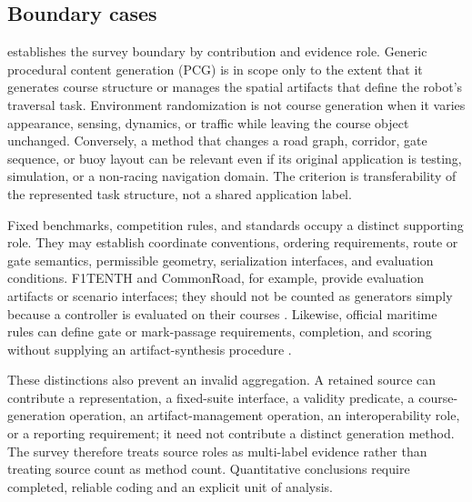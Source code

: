 \subsection{Boundary cases}

 establishes the survey boundary by contribution and
evidence role. Generic procedural content generation (PCG) is in scope only to the
extent that it generates course structure or manages the spatial artifacts that
define the robot's traversal task. Environment
randomization is not course generation when it varies appearance, sensing, dynamics,
or traffic while leaving the course object unchanged. Conversely, a method that
changes a road graph, corridor, gate sequence, or buoy layout can be relevant even if
its original application is testing, simulation, or a non-racing navigation domain.
The criterion is transferability of the represented task structure, not a shared
application label.

Fixed benchmarks, competition rules, and standards occupy a distinct supporting
role. They may establish coordinate conventions, ordering requirements, route or
gate semantics, permissible geometry, serialization interfaces, and evaluation
conditions. F1TENTH and CommonRoad, for example, provide evaluation artifacts or
scenario interfaces; they should not be counted as generators simply because a
controller is evaluated on their courses \cite{OKelly2020F1TENTHOpen,Althoff2017CommonRoadComposable}.
Likewise, official maritime rules can define gate or mark-passage requirements,
completion, and scoring without supplying an artifact-synthesis procedure
\cite{RoboNation20222022Maritime,WRSCIRSCOrganizingCommittee2019WorldRobotic}.

These distinctions also prevent an invalid aggregation. A retained source can
contribute a representation, a fixed-suite interface, a validity predicate, a
course-generation operation, an artifact-management operation, an interoperability
role, or a reporting requirement; it need not contribute a distinct generation
method. The survey therefore treats source roles as multi-label evidence rather than
treating source count as method count. Quantitative conclusions require completed,
reliable coding and an explicit unit of analysis.
